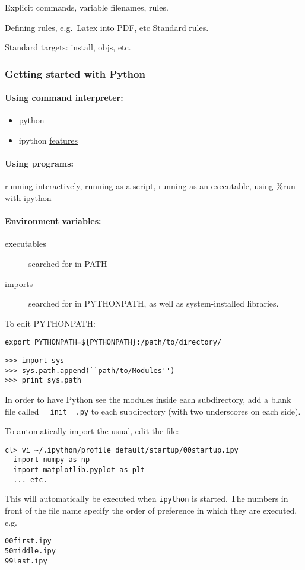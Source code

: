 \documentclass{article}
\begin{document}
Explicit commands, variable filenames, rules.

Defining rules, e.g.\ Latex into PDF, etc Standard rules.

Standard targets: install, objs, etc.
\subsubsection{Getting started with Python}
\paragraph{Using command interpreter:}
\begin{itemize}
    \item python
    \item ipython \href{http://ipython.org/ipython-doc/2/interactive/}
        {features}
\end{itemize}

\paragraph{Using programs:}
running interactively, running as a script, running as
an executable, using \%run with ipython

\paragraph{Environment variables:}
\begin{description}
    \item [executables] searched for in PATH
    \item [imports] searched for in PYTHONPATH,
        as well as system-installed libraries.
\end{description}
To edit PYTHONPATH:
\begin{verbatim}
export PYTHONPATH=${PYTHONPATH}:/path/to/directory/
\end{verbatim}
\begin{verbatim}
>>> import sys
>>> sys.path.append(``path/to/Modules'')
>>> print sys.path
\end{verbatim}
In order to have Python see the modules inside each subdirectory,
add a blank file called \verb|__init__.py| to each subdirectory
(with two underscores on each side).

To automatically import the usual, edit the file:
\begin{verbatim}
cl> vi ~/.ipython/profile_default/startup/00startup.ipy
  import numpy as np
  import matplotlib.pyplot as plt
  ... etc.
\end{verbatim}
This will automatically be executed when \verb|ipython| is started.
The numbers in front of the file name specify the order of preference
in which they are executed, e.g.\
\begin{verbatim}
00first.ipy
50middle.ipy
99last.ipy
\end{verbatim}
\end{document}
